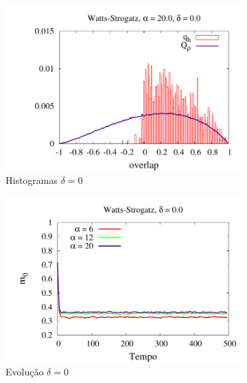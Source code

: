 \begin{figure}
    \centering
    \begin{subfigure}[]{0.45\textwidth}
        \centering
        \includegraphics[width=\textwidth]{Figures/HistoDeltaD0Beta20}
        \caption{Histogramas $\delta = 0$}
    \end{subfigure}
    \begin{subfigure}[]{0.45\textwidth}
        \centering
        \includegraphics[width=\textwidth]{Figures/MagD0Beta}
        \caption{Evolução $\delta = 0$}
    \end{subfigure}
    \begin{subfigure}[]{0.45\textwidth}
        \centering

\end{subfigure}
\end{figure}
